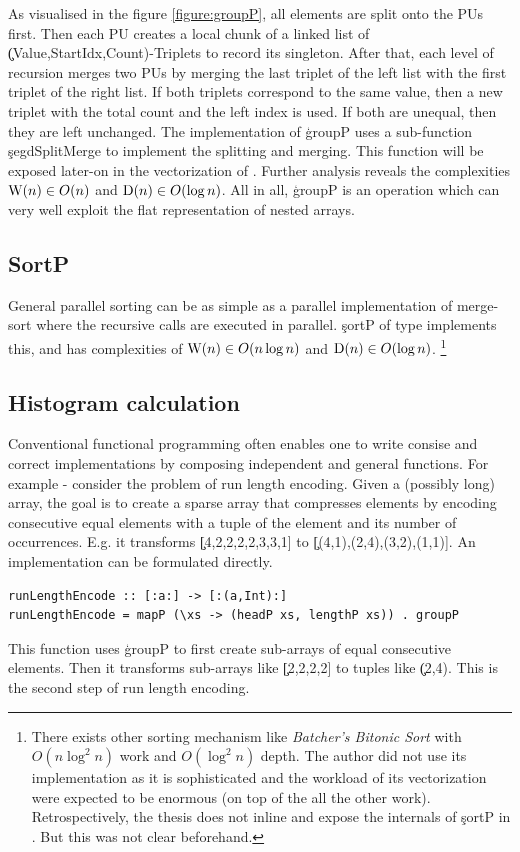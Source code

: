     As visualised in the figure \ref{figure:groupP},
    all elements are split onto the PUs first.
    Then each PU creates a local chunk of a linked list of
    \c{(Value,StartIdx,Count)}-Triplets to record its singleton.
    After that, each level of recursion merges two PUs by
    merging the last triplet of the left list with the first triplet
    of the right list. If both triplets correspond to the same value,
    then a new triplet with the total count and the left index is used.
    If both are unequal, then they are left unchanged. The implementation
    of \c{groupP} uses a sub-function \c{segdSplitMerge} to implement the
    splitting and merging. This function will be exposed later-on in
    the vectorization of \ndpn.
    Further analysis reveals the complexities $\textrm{W}(n) \in O(n)$ and $\textrm{D}(n) \in O(\log n)$.
    All in all, \c{groupP} is an operation which can very well exploit the flat representation of nested arrays.
    
  \subsection*{SortP}
    General parallel sorting can be as simple as a parallel
    implementation of merge-sort \cite{ParMergeSort1988} where the recursive calls are executed
    in parallel. \c{sortP} of type \type{[:Int:] -> [:Int:]} implements this,
    and has complexities of $\textrm{W}(n) \in O(n \log n)$
    and $\textrm{D}(n) \in O(\log n)$.
    \footnote{There exists other sorting mechanism
    like \emph{Batcher's Bitonic Sort} \cite{BitonicSort1968} with $O(n \log^2 n)$ work and $O(\log^2 n)$
    depth. The author did not use its implementation as it is sophisticated and
    the workload of its vectorization were expected to be enormous (on top of the all the other work).
    Retrospectively, the thesis does not inline and expose the internals of \c{sortP} in \ndpv.
    But this was not clear beforehand.
    }

  \subsection*{Histogram calculation}
    Conventional functional programming often enables one to write
    consise and correct implementations by composing
    independent and general functions. For example -
    consider the problem of run length encoding. Given a (possibly long) array,
    the goal is to create a sparse array that compresses elements
    by encoding consecutive equal elements
    with a tuple of the element and its number of occurrences.
    E.g. it transforms \c{[4,2,2,2,2,3,3,1]} to \c{[(4,1),(2,4),(3,2),(1,1)]}.
    An implementation can be formulated directly.
    \begin{lstlisting}
runLengthEncode :: [:a:] -> [:(a,Int):]
runLengthEncode = mapP (\xs -> (headP xs, lengthP xs)) . groupP
    \end{lstlisting}
    This function uses \c{groupP} to first create sub-arrays of
    equal consecutive elements. Then it
    transforms sub-arrays like \c{[2,2,2,2]} to tuples like \c{(2,4)}.
    This is the second step of run length encoding.
    
